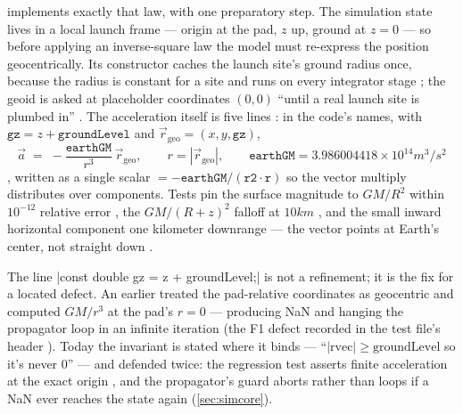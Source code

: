  implements exactly that law, with one preparatory step. The
simulation state lives in a local launch frame --- origin at the pad, $z$ up, ground at
$z = 0$  --- so before applying an inverse-square law
the model must re-express the position geocentrically. Its constructor caches the launch
site's ground radius once, because the radius is constant for a site and 
runs on every integrator stage ; the geoid is asked
at placeholder coordinates $(0, 0)$ ``until a real launch site is plumbed in''
. The acceleration itself is five lines
: in the code's names, with
$\mathtt{gz} = z + \mathtt{groundLevel}$ and $\vec r_{\mathrm{geo}} = (x, y, \mathtt{gz})$,
\begin{equation}
\vec a \;=\; -\frac{\mathtt{earthGM}}{r^{3}}\,\vec r_{\mathrm{geo}},
\qquad r = |\vec r_{\mathrm{geo}}|,
\qquad \mathtt{earthGM} = 3.986004418\times10^{14}\unit{m^3/s^2}
\end{equation}
 , written as a
single scalar  $= -\mathtt{earthGM}/(\mathtt{r2}\cdot\mathtt{r})$ so the
vector multiply distributes over components. Tests pin the surface magnitude to $GM/R^{2}$
within $10^{-12}$ relative error , the
$GM/(R+z)^{2}$ falloff at $10\unit{km}$
, and the small inward horizontal
component one kilometer downrange --- the vector points at Earth's center, not straight down
.

\begin{keyinsight}
The line \cppinline|const double gz = z + groundLevel;| is not a refinement; it is the fix
for a located defect. An earlier  treated the pad-relative
coordinates as geocentric and computed $GM/r^{3}$ at the pad's $r = 0$ --- producing NaN and
hanging the propagator loop in an infinite iteration (the F1 defect recorded in the test
file's header ). Today the invariant is
stated where it binds --- ``$|\mathrm{rvec}| \geq \mathrm{groundLevel}$ so it's never 0''
 --- and defended twice: the
 regression test asserts finite acceleration at the exact origin
, and the propagator's
 guard aborts rather than loops if a NaN ever reaches the state again
 (\cref{sec:simcore}).
\end{keyinsight}

